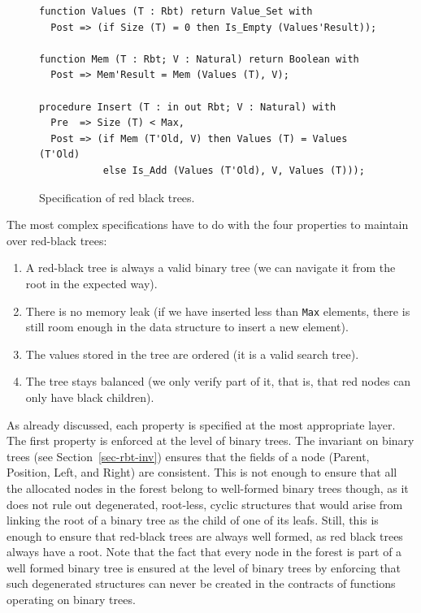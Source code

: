 \documentclass{llncs}
\begin{document}
\begin{figure}[ht]
\begin{small}
\begin{lstlisting}
function Values (T : Rbt) return Value_Set with
  Post => (if Size (T) = 0 then Is_Empty (Values'Result));

function Mem (T : Rbt; V : Natural) return Boolean with
  Post => Mem'Result = Mem (Values (T), V);

procedure Insert (T : in out Rbt; V : Natural) with
  Pre  => Size (T) < Max,
  Post => (if Mem (T'Old, V) then Values (T) = Values (T'Old)
           else Is_Add (Values (T'Old), V, Values (T)));
\end{lstlisting}
\end{small}
\caption{\label{fig-rbt-spec} Specification of red black trees.}
\end{figure}

The most complex specifications have to do with the four properties to maintain
over red-black trees:
\begin{enumerate}
 \item A red-black tree is always a valid binary tree (we can navigate it from
   the root in the expected way).
 \item There is no memory leak (if we have inserted less than \texttt{Max}
   elements, there is still room enough in the data structure to insert a new
   element).
 \item The values stored in the tree are ordered (it is a valid search tree).
 \item The tree stays balanced (we only verify part of it, that is, that red
   nodes can only have black children).
\end{enumerate}

As already discussed, each property is specified at the most appropriate layer.
The first property is enforced at the level of binary trees. The invariant on
binary trees (see Section~\ref{sec-rbt-inv}) ensures that the fields of a node
(Parent, Position, Left, and Right) are consistent. This is not enough to
ensure that all the allocated nodes in the forest belong to well-formed binary
trees though, as it does not rule out degenerated, root-less, cyclic structures
that would arise from linking the root of a binary tree as the child of one of
its leafs. Still, this is enough to ensure that red-black trees are always well
formed, as red black trees always have a root. Note that the fact that every
node in the forest is part of a well formed binary tree is ensured at the level
of binary trees by enforcing that such degenerated structures can never be
created in the contracts of functions operating on binary trees.
\end{document}

